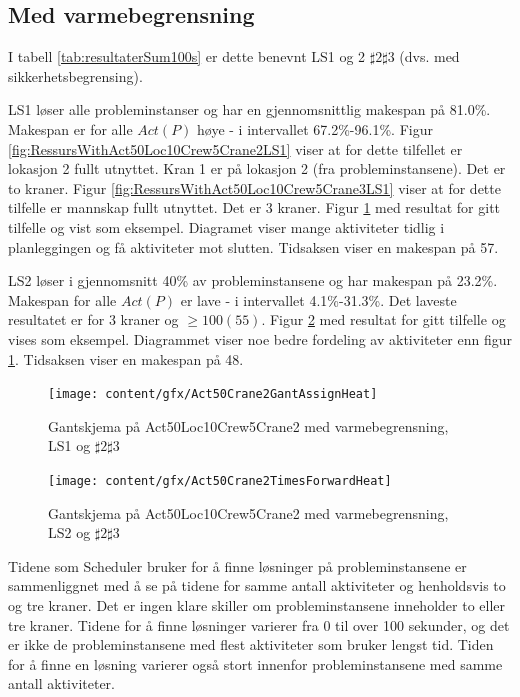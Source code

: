 \subsection{Med varmebegrensning}
I tabell \ref{tab:resultaterSum100s} er dette benevnt LS1 og 2 $\sharp 2\sharp 3$ (dvs. med sikkerhetsbegrensing).

LS1 løser alle probleminstanser og har en gjennomsnittlig makespan på 81.0\%. Makespan er for alle $Act(P)$ høye - i intervallet 67.2\%-96.1\%. Figur \ref{fig:RessursWithAct50Loc10Crew5Crane2LS1} viser at for dette tilfellet er lokasjon 2 fullt utnyttet. Kran 1 er på lokasjon 2 (fra probleminstansene). Det er to kraner. Figur \ref{fig:RessursWithAct50Loc10Crew5Crane3LS1} viser at for dette tilfelle er mannskap fullt utnyttet. Det er 3 kraner. Figur \ref{fig:GantWithAct50Loc10Crew5Crane2AssignHeat} med resultat for gitt tilfelle og vist som eksempel. Diagramet viser mange aktiviteter tidlig i planleggingen og få aktiviteter mot slutten. Tidsaksen viser en makespan på 57.

LS2 løser i gjennomsnitt 40\% av probleminstansene og har makespan på 23.2\%. Makespan for alle $Act(P)$ er lave - i intervallet 4.1\%-31.3\%. Det laveste resultatet er for 3 kraner og $\ge 100(55)$. Figur \ref{fig:GantWithAct50Loc10Crew5Crane2TFHeat} med resultat for gitt tilfelle og vises som eksempel. Diagrammet viser noe bedre fordeling av aktiviteter enn figur \ref{fig:GantWithAct50Loc10Crew5Crane2AssignHeat}. Tidsaksen viser en makespan på 48.
\begin{figure}[!h]
\centering
\texttt{[image: content/gfx/Act50Crane2GantAssignHeat]}
\caption{Gantskjema på Act50Loc10Crew5Crane2 med varmebegrensning, LS1 og $\sharp2\sharp3$}
\label{fig:GantWithAct50Loc10Crew5Crane2AssignHeat}
\end{figure}
\begin{figure}[!h]
\centering
\texttt{[image: content/gfx/Act50Crane2TimesForwardHeat]}
\caption{Gantskjema på Act50Loc10Crew5Crane2 med varmebegrensning, LS2 og $\sharp2\sharp3$}
\label{fig:GantWithAct50Loc10Crew5Crane2TFHeat}
\end{figure}
Tidene som Scheduler bruker for å finne løsninger på probleminstansene er sammenliggnet med å se på tidene for samme antall aktiviteter og henholdsvis to og tre kraner. Det er ingen klare skiller om probleminstansene inneholder to eller tre kraner. Tidene for å finne løsninger varierer fra 0 til over 100 sekunder, og det er ikke de probleminstansene med flest aktiviteter som bruker lengst tid. Tiden for å finne en løsning varierer også stort innenfor probleminstansene med samme antall aktiviteter.